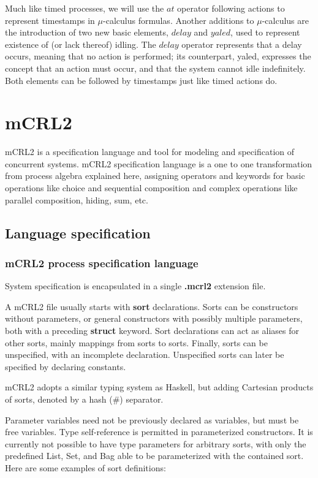 \documentclass[11pt]{article}
\theoremstyle{definition}
\theoremstyle{plain}
\begin{document}
Much like timed processes, we will use the $ at $ operator following actions to represent timestamps in $ \mu $-calculus formulas. Another additions to $ \mu $-calculus are the introduction of two new basic elements, $ delay $ and $ yaled $, used to represent existence of (or lack thereof) idling. The $ delay $ operator represents that a delay occurs, meaning that no action is performed; its counterpart, yaled, expresses the concept that an action must occur, and that the system cannot idle indefinitely. Both elements can be followed by timestamps just like timed actions do.
\clearpage
\section{mCRL2}

mCRL2 is a specification language and tool for modeling and specification of concurrent systems. mCRL2 specification language is a one to one transformation from process algebra explained here, assigning operators and keywords for basic operations like choice and sequential composition and complex operations like parallel composition, hiding, sum, etc.

\subsection{Language specification}

\subsubsection{mCRL2 process specification language}

System specification is encapsulated in a single \textbf{.mcrl2} extension file. 

A mCRL2 file usually starts with \textbf{sort} declarations. Sorts can be constructors without parameters, or general constructors with possibly multiple parameters, both with a preceding \textbf{struct} keyword. Sort declarations can act as aliases for other sorts, mainly mappings from sorts to sorts. Finally, sorts can be unspecified, with an incomplete declaration. Unspecified sorts can later be specified by declaring constants.

mCRL2 adopts a similar typing system as Haskell, but adding Cartesian products of sorts, denoted by a hash (\#) separator.

Parameter variables need not be previously declared as variables, but must be free variables. Type self-reference is permitted in parameterized constructors. It is currently not possible to have type parameters for arbitrary sorts, with only the predefined List, Set, and Bag able to be parameterized with the contained sort. Here are some examples of sort definitions:
\end{document}
